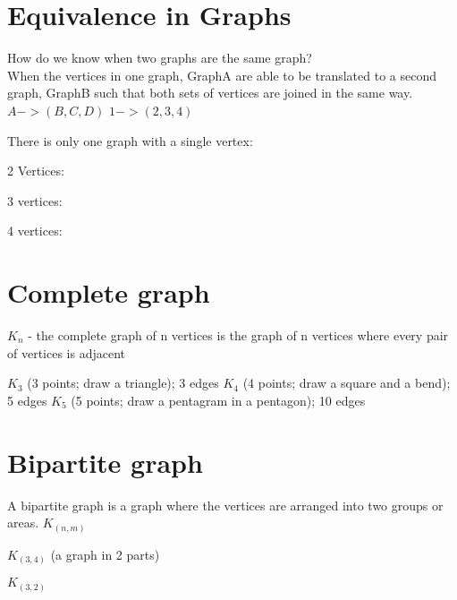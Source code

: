 \section{Equivalence in Graphs}
How do we know when two graphs are the same graph?
\\
When the vertices in one graph, GraphA are able to be translated to a second
graph, GraphB such that both sets of vertices are joined in the same way.
$ A-> (B,C,D) $ %
$ 1-> (2,3,4) $ %

There is only one graph with a single vertex:
\begin{tikzpicture}
\end{tikzpicture}


2 Vertices:

3 vertices:

4 vertices:


\section{Complete graph}

$K_n$ - the complete graph of n vertices is the graph of n vertices
where every pair of vertices is adjacent

$K_3$ (3 points; draw a triangle); 3 edges
$K_4$ (4 points; draw a square and a bend); 5 edges
$K_5$ (5 points; draw a pentagram in a pentagon); 10 edges

\section{Bipartite graph}
A bipartite graph is a graph where the vertices are arranged into two groups or
areas.
$K_(n,m)$

$K_(3,4)$ (a graph in 2 parts) %

$K_(3,2)$

